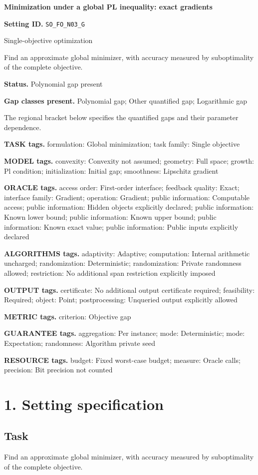 \documentclass[10pt,a4paper]{article}
\begin{document}
\raggedright

{\LARGE\bfseries\sffamily\color{AtlasNavy} Minimization under a global PL inequality: exact gradients\par}\vspace{5pt}
\textbf{Setting ID.} \texttt{SO\_\allowbreak{}FO\_\allowbreak{}N03\_\allowbreak{}G}

Single-objective optimization

Find an approximate global minimizer, with accuracy measured by suboptimality of the complete objective.

\textbf{Status.} Polynomial gap present

\textbf{Gap classes present.} Polynomial gap; Other quantified gap; Logarithmic gap

The regional bracket below specifies the quantified gaps and their parameter dependence.

\textbf{TASK tags.} formulation: Global minimization; task family: Single objective

\textbf{MODEL tags.} convexity: Convexity not assumed; geometry: Full space; growth: Pl condition; initialization: Initial gap; smoothness: Lipschitz gradient

\textbf{ORACLE tags.} access order: First-order interface; feedback quality: Exact; interface family: Gradient; operation: Gradient; public information: Computable access; public information: Hidden objects explicitly declared; public information: Known lower bound; public information: Known upper bound; public information: Known exact value; public information: Public inputs explicitly declared

\textbf{ALGORITHMS tags.} adaptivity: Adaptive; computation: Internal arithmetic uncharged; randomization: Deterministic; randomization: Private randomness allowed; restriction: No additional span restriction explicitly imposed

\textbf{OUTPUT tags.} certificate: No additional output certificate required; feasibility: Required; object: Point; postprocessing: Unqueried output explicitly allowed

\textbf{METRIC tags.} criterion: Objective gap

\textbf{GUARANTEE tags.} aggregation: Per instance; mode: Deterministic; mode: Expectation; randomness: Algorithm private seed

\textbf{RESOURCE tags.} budget: Fixed worst-case budget; measure: Oracle calls; precision: Bit precision not counted

\section{1. Setting specification}
\subsection{Task}
Find an approximate global minimizer, with accuracy measured by suboptimality of the complete objective.
\end{document}
